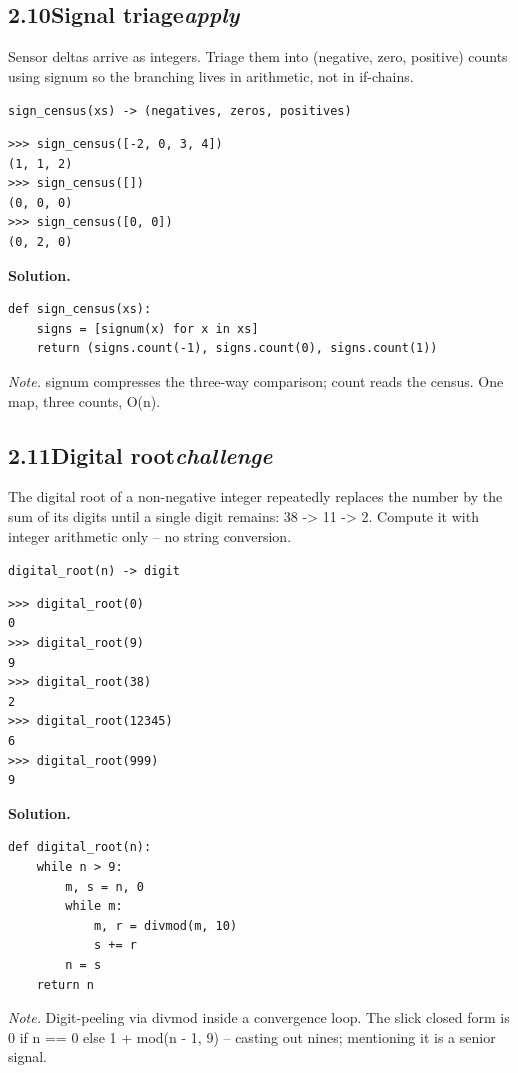 \documentclass[10pt,letterpaper]{book}
\begin{document}
\subsection*{2.10\quad Signal triage\hfill\textnormal{\textit{apply}}}
Sensor deltas arrive as integers. Triage them into (negative, zero, positive) counts using signum so the branching lives in arithmetic, not in if-chains.

\noindent\texttt{sign\_census(xs) -> (negatives, zeros, positives)}
\begin{lstlisting}[style=ex]
>>> sign_census([-2, 0, 3, 4])
(1, 1, 2)
>>> sign_census([])
(0, 0, 0)
>>> sign_census([0, 0])
(0, 2, 0)
\end{lstlisting}
\noindent\textbf{Solution.}
\begin{lstlisting}[style=code]
def sign_census(xs):
    signs = [signum(x) for x in xs]
    return (signs.count(-1), signs.count(0), signs.count(1))
\end{lstlisting}
\noindent\textit{Note.} signum compresses the three-way comparison; count reads the census. One map, three counts, O(n).


\subsection*{2.11\quad Digital root\hfill\textnormal{\textit{challenge}}}
The digital root of a non-negative integer repeatedly replaces the number by the sum of its digits until a single digit remains: 38 -> 11 -> 2. Compute it with integer arithmetic only -- no string conversion.

\noindent\texttt{digital\_root(n) -> digit}
\begin{lstlisting}[style=ex]
>>> digital_root(0)
0
>>> digital_root(9)
9
>>> digital_root(38)
2
>>> digital_root(12345)
6
>>> digital_root(999)
9
\end{lstlisting}
\noindent\textbf{Solution.}
\begin{lstlisting}[style=code]
def digital_root(n):
    while n > 9:
        m, s = n, 0
        while m:
            m, r = divmod(m, 10)
            s += r
        n = s
    return n
\end{lstlisting}
\noindent\textit{Note.} Digit-peeling via divmod inside a convergence loop. The slick closed form is 0 if n == 0 else 1 + mod(n - 1, 9) -- casting out nines; mentioning it is a senior signal.
\end{document}

